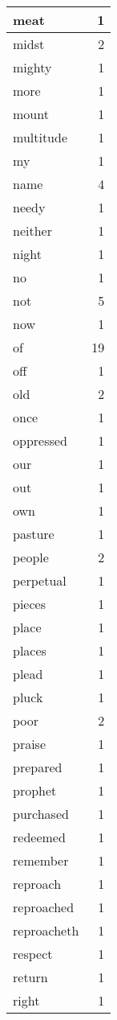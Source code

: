 \begin{center}
\begin{longtable}{l|r}
meat & 1 \\ \hline
midst & 2 \\ \hline
mighty & 1 \\ \hline
more & 1 \\ \hline
mount & 1 \\ \hline
multitude & 1 \\ \hline
my & 1 \\ \hline
name & 4 \\ \hline
needy & 1 \\ \hline
neither & 1 \\ \hline
night & 1 \\ \hline
no & 1 \\ \hline
not & 5 \\ \hline
now & 1 \\ \hline
of & 19 \\ \hline
off & 1 \\ \hline
old & 2 \\ \hline
once & 1 \\ \hline
oppressed & 1 \\ \hline
our & 1 \\ \hline
out & 1 \\ \hline
own & 1 \\ \hline
pasture & 1 \\ \hline
people & 2 \\ \hline
perpetual & 1 \\ \hline
pieces & 1 \\ \hline
place & 1 \\ \hline
places & 1 \\ \hline
plead & 1 \\ \hline
pluck & 1 \\ \hline
poor & 2 \\ \hline
praise & 1 \\ \hline
prepared & 1 \\ \hline
prophet & 1 \\ \hline
purchased & 1 \\ \hline
redeemed & 1 \\ \hline
remember & 1 \\ \hline
reproach & 1 \\ \hline
reproached & 1 \\ \hline
reproacheth & 1 \\ \hline
respect & 1 \\ \hline
return & 1 \\ \hline
right & 1 \\ \hline

\end{longtable}
\end{center}
